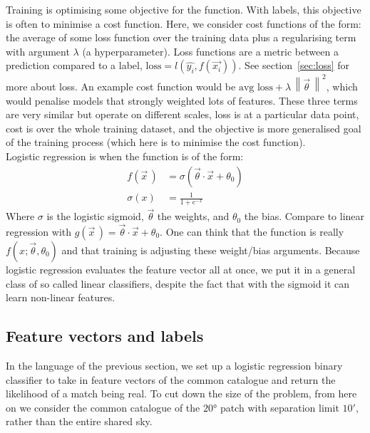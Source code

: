 \documentclass[12pt,a4paper]{article}
\newcommand{\norm}[1]{\left\lVert#1\right\rVert}
\begin{document}
Training is optimising some objective for the function. With labels, this objective is often to minimise a cost function. Here, we consider cost functions of the form: the average of some loss function over the training data plus a regularising term with argument $\lambda$ (a hyperparameter). Loss functions are a metric between a prediction compared to a label, $\text{loss} = l(\hat{y_i},f(\vec{x_i}))$. See section~\ref{sec:loss} for more about loss. An example cost function would be $\text{avg loss} + \lambda\,\norm{\vec{\theta}\,}^2$, which would penalise models that strongly weighted lots of features. These three terms are very similar but operate on different scales, loss is at a particular data point, cost is over the whole training dataset, and the objective is more generalised goal of the training process (which here is to minimise the cost function).\\

Logistic regression is when the function is of the form:
\begin{equation}
\begin{split}
    f(\vec{x}\,) &= \sigma(\vec{\theta}\cdot\vec{x}+\theta_0) \\
    \sigma(x) &= \frac{1}{1+e^{-x}}       
\end{split}
\end{equation}
Where $\sigma$ is the logistic sigmoid, $\vec{\theta}$ the weights, and $\theta_0$ the bias. Compare to linear regression with $g(\vec{x}\,) = \vec{\theta}\cdot\vec{x}+\theta_0$. One can think that the function is really $f(x;\vec{\theta},\theta_0)$ and that training is adjusting these weight/bias arguments. Because logistic regression evaluates the feature vector all at once, we put it in a general class of so called linear classifiers, despite the fact that with the sigmoid it can learn non-linear features.

\subsection{Feature vectors and labels}
In the language of the previous section, we set up a logistic regression binary classifier to take in feature vectors of the common catalogue and return the likelihood of a match being real. To cut down the size of the problem, from here on we consider the common catalogue of the $\ang{20}$ patch with separation limit $\ang{;10;}$, rather than the entire shared sky.\\
\end{document}
